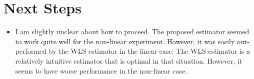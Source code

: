 \documentclass[12pt]{article}
\begin{document}
\section*{Next Steps}

\begin{itemize}
  \item I am slightly unclear about how to proceed. The proposed estimator 
    seemed to work quite well for the non-linear experiment. However, it was 
    easily out-performed by the WLS estimator in the linear case. The WLS 
    estimator is a relatively intuitive estimator that is optimal in that 
    situation. However, it seems to have worse performance in the non-linear 
    case.
\end{itemize}

\printbibliography
\end{document}
